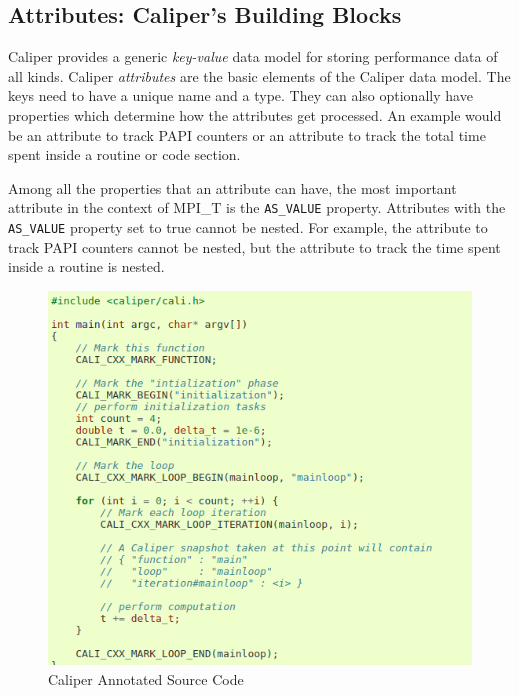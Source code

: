 \subsection{Attributes: Caliper's Building Blocks}
Caliper provides a generic \textit{key-value} data model for storing performance data of all kinds. Caliper \textit{attributes} are the basic elements of the Caliper data model. The keys need to have a unique name and a type. They can also optionally have properties which determine how the attributes get processed. An example would be an attribute to track PAPI counters or an attribute to track the total time spent inside a routine or code section. 
\par Among all the properties that an attribute can have, the most important attribute in the context of MPI\_T is the \verb+AS_VALUE+ property. Attributes with the \verb+AS_VALUE+ property set to true cannot be nested. For example, the attribute to track PAPI counters cannot be nested, but the attribute to track the time spent inside a routine is nested.
\begin{center}
	\begin{figure}[tbp!]
         \centering
  \captionsetup{justification=centering}
		\includegraphics[scale=0.3, width=\columnwidth, keepaspectratio]{figures/cali-example}
		\caption{Caliper Annotated Source Code}
		\label{fig:caliexample}
	\end{figure}
\end{center}

